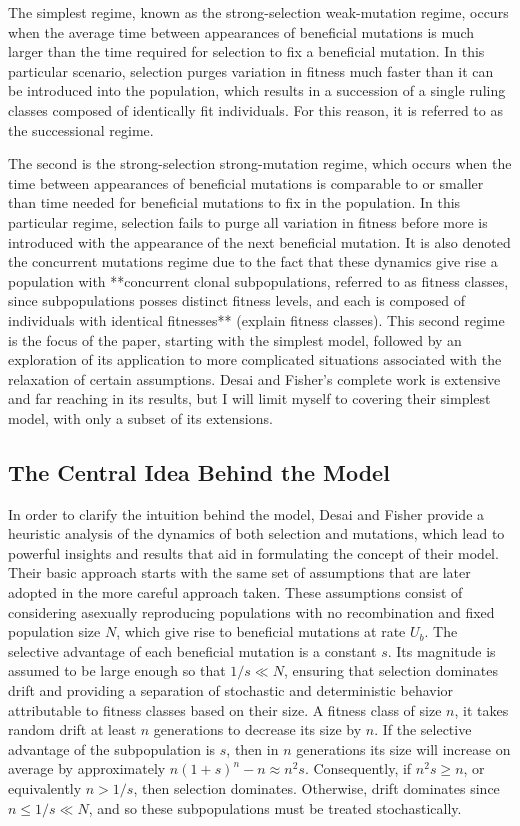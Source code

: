 \documentclass[12pt]{article}
\begin{document}
The simplest regime, known as the strong-selection weak-mutation regime, occurs when the average time between appearances of beneficial mutations is much larger than the time required for selection to fix a beneficial mutation.  In this particular scenario, selection purges variation in fitness much faster than it can be introduced into the population, which results in a succession of a single ruling classes composed of identically fit individuals.  For this reason, it is referred to as the successional regime.  

The second is the strong-selection strong-mutation regime, which occurs when the time between appearances of beneficial mutations is comparable to or smaller than time needed for beneficial mutations to fix in the population.  In this particular regime, selection fails to purge all variation in fitness before more is introduced with the appearance of the next beneficial mutation.  It is also denoted the concurrent mutations regime due to the fact that these dynamics give rise a population with **concurrent clonal subpopulations, referred to as fitness classes, since subpopulations posses distinct fitness levels, and each is composed of individuals with identical fitnesses** (explain fitness classes).  This second regime is the focus of the paper, starting with the simplest model, followed by an exploration of its application to more complicated situations associated with the relaxation of certain assumptions.  Desai and Fisher's complete work is extensive and far reaching in its results, but I will limit myself to covering their simplest model, with only a subset of its extensions. 

\subsection*{The Central Idea Behind the Model}
In order to clarify the intuition behind the model, Desai and Fisher provide a heuristic analysis of the dynamics of both selection and mutations, which lead to powerful insights and results that aid in formulating the concept of their model.  Their basic approach starts with the same set of assumptions that are later adopted in the more careful approach taken.  These assumptions consist of considering asexually reproducing populations with no recombination and fixed population size $N$, which give rise to beneficial mutations at rate $U_b$.  The selective advantage of each beneficial mutation is a constant $s$.  Its magnitude is assumed to be large enough so that $1/s \ll N$, ensuring that selection dominates drift and providing a separation of stochastic and deterministic behavior attributable to fitness classes based on their size.  A fitness class of size $n$, it takes random drift at least $n$ generations to decrease its size by $n$.  If the selective advantage of the subpopulation is $s$, then in $n$ generations its size will increase on average by approximately $n(1+s)^n-n \approx n^2s$.  Consequently, if $n^2s \ge n$, or equivalently $n>1/s$, then selection dominates.  Otherwise, drift dominates since $n \leq 1/s \ll N$, and so these subpopulations must be treated stochastically.
\end{document}

